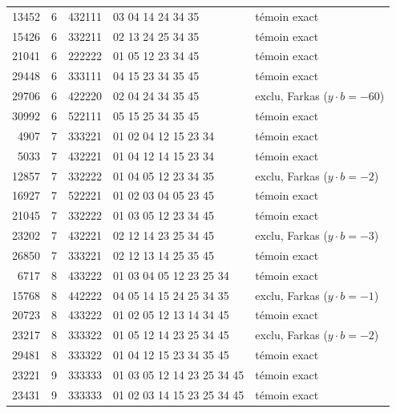 \begin{longtable}{rrlll}
13452 & 6 & 432111 & 03 04 14 24 34 35 & t\'emoin exact\\
15426 & 6 & 332211 & 02 13 24 25 34 35 & t\'emoin exact\\
21041 & 6 & 222222 & 01 05 12 23 34 45 & t\'emoin exact\\
29448 & 6 & 333111 & 04 15 23 34 35 45 & t\'emoin exact\\
29706 & 6 & 422220 & 02 04 24 34 35 45 & exclu, Farkas ($y\cdot b=-60$)\\
30992 & 6 & 522111 & 05 15 25 34 35 45 & t\'emoin exact\\
4907 & 7 & 333221 & 01 02 04 12 15 23 34 & t\'emoin exact\\
5033 & 7 & 432221 & 01 04 12 14 15 23 34 & t\'emoin exact\\
12857 & 7 & 332222 & 01 04 05 12 23 34 35 & exclu, Farkas ($y\cdot b=-2$)\\
16927 & 7 & 522221 & 01 02 03 04 05 23 45 & t\'emoin exact\\
21045 & 7 & 332222 & 01 03 05 12 23 34 45 & t\'emoin exact\\
23202 & 7 & 432221 & 02 12 14 23 25 34 45 & exclu, Farkas ($y\cdot b=-3$)\\
26850 & 7 & 333221 & 02 12 13 14 25 35 45 & t\'emoin exact\\
6717 & 8 & 433222 & 01 03 04 05 12 23 25 34 & t\'emoin exact\\
15768 & 8 & 442222 & 04 05 14 15 24 25 34 35 & exclu, Farkas ($y\cdot b=-1$)\\
20723 & 8 & 433222 & 01 02 05 12 13 14 34 45 & t\'emoin exact\\
23217 & 8 & 333322 & 01 05 12 14 23 25 34 45 & exclu, Farkas ($y\cdot b=-2$)\\
29481 & 8 & 333322 & 01 04 12 15 23 34 35 45 & t\'emoin exact\\
23221 & 9 & 333333 & 01 03 05 12 14 23 25 34 45 & t\'emoin exact\\
23431 & 9 & 333333 & 01 02 03 14 15 23 25 34 45 & t\'emoin exact\\
\bottomrule\end{longtable}

